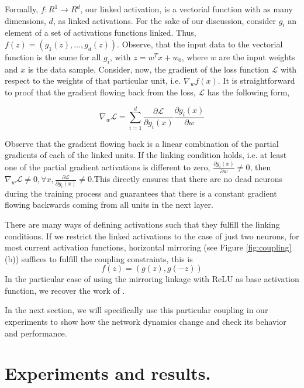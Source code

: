 \documentclass[10pt,twocolumn,letterpaper]{article}
\begin{document}
Formally, $f\colon R^1\rightarrow R^{d}$, our linked activation, is a vectorial function with as many dimensions, $d$, as linked activations.  For the sake of our discussion, consider $g_i$ an element of a set of activations functions linked. Thus,  $f(z) = (g_1(z), \dots, g_d(z))$. Observe, that the input data to the vectorial function is the same for all $g_i$, with $z=w^Tx+w_0$, where $w$ are the input weights and $x$ is the data sample. Consider, now, the gradient of the loss function $\mathcal{L}$ with respect to the weights of that particular unit, i.e. $\nabla_w f(x)$. It is straightforward to proof that the gradient flowing back from the loss, $\mathcal{L}$ has the following form,

$$\nabla_w \mathcal{L}= \sum\limits_{i=1}^d  \frac{\partial \mathcal{L}}{\partial g_i(x)}\frac{\partial g_i(x)}{\partial w}$$

Observe that the gradient flowing back is a linear combination of the partial gradients of each of the linked units. If the linking condition holds, i.e. at least one of the partial gradient activations is different to zero, $\frac{\partial g_i(x)}{\partial w} \neq 0$, then $\nabla_w \mathcal{L}\neq0, \forall x, \frac{\partial \mathcal{L}}{\partial g_i(x)}\neq 0$.This directly ensures that there are no dead neurons during the training process and guarantees that there is a constant gradient flowing backwards coming from all units in the next layer.

There are many ways of defining activations such that they fulfill the linking conditions. If we restrict the linked activations to the case of just two neurons, for most current activation functions, horizontal mirroring (see Figure \ref{fig:coupling}(b)) suffices to fulfill the coupling constraints, this is
\begin{equation}
f(z) = (g(z),g(-z))
\label{eq:doublerelu}
\end{equation}
In the particular case of using the mirroring linkage with ReLU as base activation function, we recover the work of \cite{crelu}.

In the next section, we will specifically use this particular coupling in our experiments to show how the network dynamics change and check its behavior and performance.

\section{Experiments and results.}\label{sec:experiments}
\end{document}
